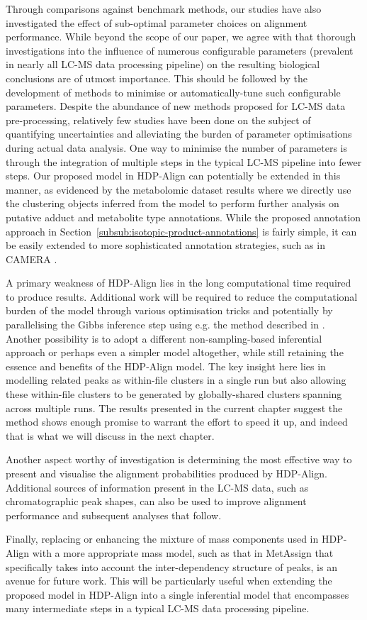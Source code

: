 Through comparisons against benchmark methods, our studies have also investigated the effect of sub-optimal parameter choices on alignment performance. While beyond the scope of our paper, we agree with \cite{Smith2013, Smith2013a} that thorough investigations into the influence of numerous configurable parameters (prevalent in nearly all LC-MS data processing pipeline) on the resulting biological conclusions are of utmost importance. This should be followed by the development of methods to minimise or automatically-tune such configurable parameters. Despite the abundance of new methods proposed for LC-MS data pre-processing, relatively few studies have been done on the subject of quantifying uncertainties and alleviating the burden of parameter optimisations during actual data analysis. One way to minimise the number of parameters is through the integration of multiple steps in the typical LC-MS pipeline into fewer steps. Our proposed model in HDP-Align can potentially be extended in this manner, as evidenced by the metabolomic dataset results where we directly use the clustering objects inferred from the model to perform further analysis on putative adduct and metabolite type annotations. While the proposed annotation approach in Section~\ref{subsub:isotopic-product-annotations} is fairly simple, it can be easily extended to more sophisticated annotation strategies, such as in CAMERA \cite{Kuhl2012}. 

A primary weakness of HDP-Align lies in the long computational time required to produce results. Additional work will be required to reduce the computational burden of the model through various optimisation tricks and potentially by parallelising the Gibbs inference step using e.g. the method described in \cite{Lovell2012}. Another possibility is to adopt a different non-sampling-based inferential approach or perhaps even a simpler model altogether, while still retaining the essence and benefits of the HDP-Align model. The key insight here lies in modelling related peaks as within-file clusters in a single run but also allowing these within-file clusters to be generated by globally-shared clusters spanning across multiple runs. The results presented in the current chapter suggest the method shows enough promise to warrant the effort to speed it up, and indeed that is what we will discuss in the next chapter.

Another aspect worthy of investigation is determining the most effective way to present and visualise the alignment probabilities produced by HDP-Align. Additional sources of information present in the LC-MS data, such as chromatographic peak shapes, can also be used to improve alignment performance and subsequent analyses that follow. 

Finally, replacing or enhancing the mixture of mass components used in HDP-Align with a more appropriate mass model, such as that in MetAssign \cite{Daly2014} that specifically takes into account the inter-dependency structure of peaks, is an avenue for future work. This will be particularly useful when extending the proposed model in HDP-Align into a single inferential model that encompasses many intermediate steps in a typical LC-MS data processing pipeline.